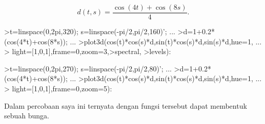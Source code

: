 \documentclass{article}
\begin{document}
\begin{eulernotebook}
\begin{eulercomment}
\end{eulercomment}
\begin{eulerformula}
\[
d(t,s) = \frac{\cos(4t)+\cos(8s)}{4}.
\]
\end{eulerformula}
\begin{eulerprompt}
>t=linspace(0,2pi,320); s=linspace(-pi/2,pi/2,160)'; ...
>d=1+0.2*(cos(4*t)+cos(8*s)); ...
>plot3d(cos(t)*cos(s)*d,sin(t)*cos(s)*d,sin(s)*d,hue=1, ...
>  light=[1,0,1],frame=0,zoom=3,>spectral, >levels):
\end{eulerprompt}
\begin{eulerprompt}
>t=linspace(0,2pi,270); s=linspace(-pi/2,pi/2,80)'; ...
>d=1+0.2*(cos(4*t)+cos(8*s)); ...
>plot3d(cos(t)*cos(s)*d,sin(t)*cos(s)*d,sin(s)*d,hue=1, ...
>  light=[1,0,1],frame=0,zoom=5):
\end{eulerprompt}
\begin{eulercomment}
Dalam percobaan saya ini ternyata dengan fungsi tersebut dapat
membentuk sebuah bunga.


\end{eulercomment}
\end{eulernotebook}
\end{document}
